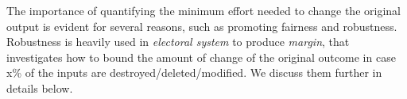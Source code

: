\documentclass[11pt]{article}
\begin{document}
\smallskip {}
The importance of quantifying the minimum effort needed to change the original output is evident for several reasons, such as  promoting fairness and robustness. Robustness is heavily used in {\em electoral system} to produce {\em margin},  that investigates how to bound the amount of change of the original outcome in case x\% of the inputs are destroyed/deleted/modified. We discuss them further in details below.



\end{document}
